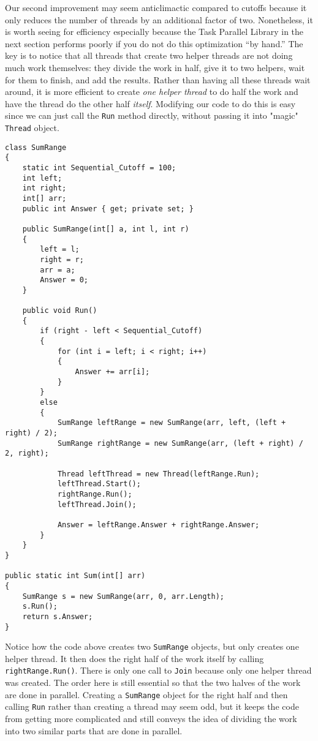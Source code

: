 \documentclass[10pt]{article}
\begin{document}
Our second improvement may seem anticlimactic compared to cutoffs
because it only reduces the number of threads by an additional
factor of two.  Nonetheless, it is worth seeing for efficiency
especially because the Task Parallel Library in the next section performs
poorly if you do not do this optimization ``by hand.''  The key is to
notice that all threads that create two helper threads are not doing
much work themselves: they divide the work in half, give it to two
helpers, wait for them to finish, and add the results.  Rather than
having all these threads wait around, it is more efficient to create
\emph{one helper thread} to do half the work and have the thread do
the other half \emph{itself}.  Modifying our code to do this is easy
since we can just call the {\tt Run} method directly, without passing 
it into "magic" {\tt Thread} object.
\begin{verbatim}
class SumRange
{
    static int Sequential_Cutoff = 100;
    int left;
    int right;
    int[] arr;
    public int Answer { get; private set; }

    public SumRange(int[] a, int l, int r)
    {
        left = l;
        right = r;
        arr = a;
        Answer = 0;
    }

    public void Run()
    {
        if (right - left < Sequential_Cutoff)
        {
            for (int i = left; i < right; i++)
            {
                Answer += arr[i];
            }
        }
        else
        {
            SumRange leftRange = new SumRange(arr, left, (left + right) / 2);
            SumRange rightRange = new SumRange(arr, (left + right) / 2, right);

            Thread leftThread = new Thread(leftRange.Run);
            leftThread.Start();
            rightRange.Run();
            leftThread.Join();

            Answer = leftRange.Answer + rightRange.Answer;
        }
    }
}

public static int Sum(int[] arr)
{
    SumRange s = new SumRange(arr, 0, arr.Length);
    s.Run();
    return s.Answer;
}
\end{verbatim}
Notice how the code above creates two {\tt SumRange} objects, but 
only creates one helper thread. It then does the right half of the 
work itself by calling {\tt rightRange.Run()}. There is
only one call to {\tt Join} because only one helper thread was
created.  The order here is still essential so that the two halves of
the work are done in parallel.  Creating a {\tt SumRange} object for
the right half and then calling {\tt Run} rather than creating a
thread may seem odd, but it keeps the code from getting more
complicated and still conveys the idea of dividing the work into two
similar parts that are done in parallel.
\end{document}
